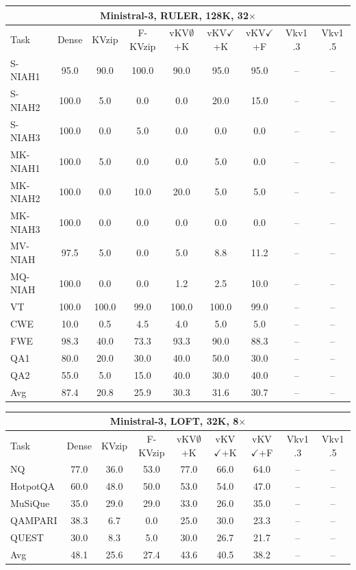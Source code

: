 \begin{tabular}{lcccccccc}
\toprule
\multicolumn{9}{c}{Ministral-3, RULER, 128K, 32$\times$} \\
\midrule
Task & Dense & KVzip & F-KVzip & vKV$\emptyset$+K & vKV$\checkmark$+K & vKV$\checkmark$+F & Vkv1 .3 & Vkv1 .5 \\
\midrule
S-NIAH1 & 95.0 & 90.0 & 100.0 & 90.0 & 95.0 & 95.0 & -- & -- \\
S-NIAH2 & 100.0 & 5.0 & 0.0 & 0.0 & 20.0 & 15.0 & -- & -- \\
S-NIAH3 & 100.0 & 0.0 & 5.0 & 0.0 & 0.0 & 0.0 & -- & -- \\
MK-NIAH1 & 100.0 & 5.0 & 0.0 & 0.0 & 5.0 & 0.0 & -- & -- \\
MK-NIAH2 & 100.0 & 0.0 & 10.0 & 20.0 & 5.0 & 5.0 & -- & -- \\
MK-NIAH3 & 100.0 & 0.0 & 0.0 & 0.0 & 0.0 & 0.0 & -- & -- \\
MV-NIAH & 97.5 & 5.0 & 0.0 & 5.0 & 8.8 & 11.2 & -- & -- \\
MQ-NIAH & 100.0 & 0.0 & 0.0 & 1.2 & 2.5 & 10.0 & -- & -- \\
VT & 100.0 & 100.0 & 99.0 & 100.0 & 100.0 & 99.0 & -- & -- \\
CWE & 10.0 & 0.5 & 4.5 & 4.0 & 5.0 & 5.0 & -- & -- \\
FWE & 98.3 & 40.0 & 73.3 & 93.3 & 90.0 & 88.3 & -- & -- \\
QA1 & 80.0 & 20.0 & 30.0 & 40.0 & 50.0 & 30.0 & -- & -- \\
QA2 & 55.0 & 5.0 & 15.0 & 40.0 & 30.0 & 40.0 & -- & -- \\
\midrule
Avg & 87.4 & 20.8 & 25.9 & 30.3 & 31.6 & 30.7 & -- & -- \\
\bottomrule
\end{tabular}
\vspace{0.8em}

\begin{tabular}{lcccccccc}
\toprule
\multicolumn{9}{c}{Ministral-3, LOFT, 32K, 8$\times$} \\
\midrule
Task & Dense & KVzip & F-KVzip & vKV$\emptyset$+K & vKV$\checkmark$+K & vKV$\checkmark$+F & Vkv1 .3 & Vkv1 .5 \\
\midrule
NQ & 77.0 & 36.0 & 53.0 & 77.0 & 66.0 & 64.0 & -- & -- \\
HotpotQA & 60.0 & 48.0 & 50.0 & 53.0 & 54.0 & 47.0 & -- & -- \\
MuSiQue & 35.0 & 29.0 & 29.0 & 33.0 & 26.0 & 35.0 & -- & -- \\
QAMPARI & 38.3 & 6.7 & 0.0 & 25.0 & 30.0 & 23.3 & -- & -- \\
QUEST & 30.0 & 8.3 & 5.0 & 30.0 & 26.7 & 21.7 & -- & -- \\
\midrule
Avg & 48.1 & 25.6 & 27.4 & 43.6 & 40.5 & 38.2 & -- & -- \\
\bottomrule
\end{tabular}
\vspace{0.8em}

